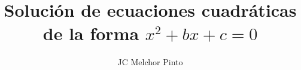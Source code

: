 \documentclass[12pt,addpoints,answers]{guia}
\title{Solución de ecuaciones cuadráticas de la forma $x^2+bx+c=0$}
\author{JC Melchor Pinto}
\begin{document}
\pagestyle{headandfoot}
\INFO%
\begin{multicols}{2}%
\end{multicols}%
%
\begin{questions}
    \questionboxed[10]{}
    \questionboxed[10]{}
    \questionboxed[10]{}
    \questionboxed[20]{}
    \questionboxed[20]{}
    \questionboxed[10]{}
    \questionboxed[20]{}
\end{questions}
\end{document}
